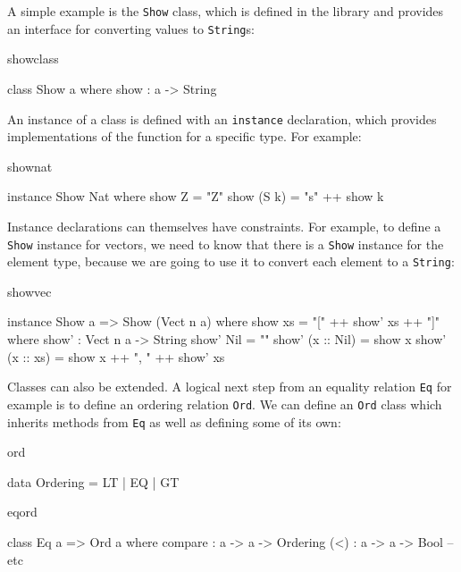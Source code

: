 A simple example is the \texttt{Show} class, which is defined in the
library and provides an interface for converting values to \texttt{String}s:

\begin{SaveVerbatim}{showclass}

class Show a where
    show : a -> String

\end{SaveVerbatim}

\noindent
An instance of a class is defined with an \texttt{instance} declaration, which
provides implementations of the function for a specific type. For example:

\begin{SaveVerbatim}{shownat}

instance Show Nat where
    show Z = "Z"
    show (S k) = "s" ++ show k

\end{SaveVerbatim}

\noindent
Instance declarations can themselves have constraints. For example, to define a
\texttt{Show} instance for vectors, we need to know that there is a
\texttt{Show} instance for the element type, because we are going to use it to
convert each element to a \texttt{String}:

\begin{SaveVerbatim}{showvec}

instance Show a => Show (Vect n a) where
    show xs = "[" ++ show' xs ++ "]" where
        show' : Vect n a -> String
        show' Nil        = ""
        show' (x :: Nil) = show x
        show' (x :: xs)  = show x ++ ", " ++ show' xs

\end{SaveVerbatim}

\noindent
Classes can also be extended. A logical next step from an equality relation
\texttt{Eq} for example is to define an ordering relation \texttt{Ord}. We can
define an \texttt{Ord} class which inherits methods from \texttt{Eq} as well as
defining some of its own:

\begin{SaveVerbatim}{ord}

data Ordering = LT | EQ | GT

\end{SaveVerbatim}

\begin{SaveVerbatim}{eqord}

class Eq a => Ord a where
    compare : a -> a -> Ordering
    (<) : a -> a -> Bool
    -- etc

\end{SaveVerbatim}


